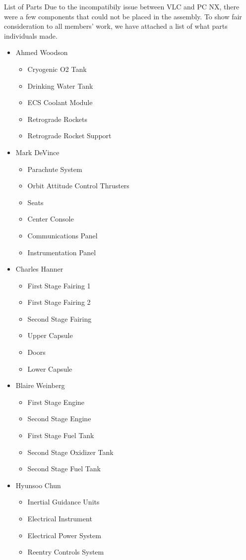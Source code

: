 \documentclass[10pt]{beamer}
\begin{document}
\appendix
\begin{frame}{List of Parts}
\label{appx:A}
Due to the incompatibily issue between VLC and PC NX, there were a few components that could not be placed in the assembly. To show fair consideration to all members' work, we have attached a list of what parts individuals made. 
\begin{multicols}{2}

\begin{itemize}
	\item Ahmed Woodson
	\begin{itemize}
		\item Cryogenic O2 Tank
		\item Drinking Water Tank
		\item ECS Coolant Module
		\item Retrograde Rockets
		\item Retrograde Rocket Support
	\end{itemize}
	\item Mark DeVince
	\begin{itemize}
		\item Parachute System
		\item Orbit Attitude Control Thrusters
		\item Seats
		\item Center Console
		\item Communications Panel
		\item Instrumentation Panel
	\end{itemize}
	\item Charles Hanner
	\begin{itemize}
		\item First Stage Fairing 1
		\item First Stage Fairing 2
		\item Second Stage Fairing
		\item Upper Capsule
		\item Doors
		\item Lower Capsule 
	\end{itemize}
	\item Blaire Weinberg
	\begin{itemize}
		\item First Stage Engine
		\item Second Stage Engine
		\item First Stage Fuel Tank
		\item Second Stage Oxidizer Tank
		\item Second Stage Fuel Tank
	\end{itemize}
	\item Hyunsoo Chun
	\begin{itemize}
		\item Inertial Guidance Units
		\item Electrical Instrument
		\item Electrical Power System
		\item Reentry Controls System
	\end{itemize}
\end{itemize}
\end{multicols}
\end{frame}
\end{document}
